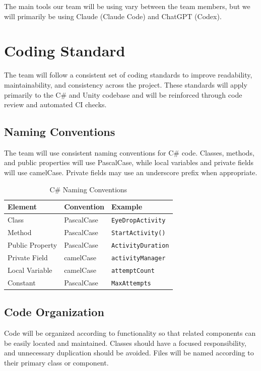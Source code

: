 \documentclass{article}
\begin{document}
The main tools our team will be using vary between the team members, but we will primarily be using Claude (Claude Code) and ChatGPT (Codex).
\section{Coding Standard}

The team will follow a consistent set of coding standards to improve
readability, maintainability, and consistency across the project. These
standards will apply primarily to the C\# and Unity codebase and will be
reinforced through code review and automated CI checks.

\subsection{Naming Conventions}

The team will use consistent naming conventions for C\# code. Classes,
methods, and public properties will use PascalCase, while local variables
and private fields will use camelCase. Private fields may use an underscore
prefix when appropriate.

\begin{table}[H]
    \centering
    \begin{tabular}{|l|l|l|}
        \hline
        \textbf{Element} & \textbf{Convention} & \textbf{Example} \\ \hline
        Class & PascalCase & \texttt{EyeDropActivity} \\ \hline
        Method & PascalCase & \texttt{StartActivity()} \\ \hline
        Public Property & PascalCase & \texttt{ActivityDuration} \\ \hline
        Private Field & camelCase & \texttt{activityManager} \\ \hline
        Local Variable & camelCase & \texttt{attemptCount} \\ \hline
        Constant & PascalCase & \texttt{MaxAttempts} \\ \hline
    \end{tabular}
    \caption{C\# Naming Conventions}
    \label{tab:csharp-naming}
\end{table}


\subsection{Code Organization}

Code will be organized according to functionality so that related
components can be easily located and maintained. Classes should have a
focused responsibility, and unnecessary duplication should be avoided.
Files will be named according to their primary class or component.
\end{document}
